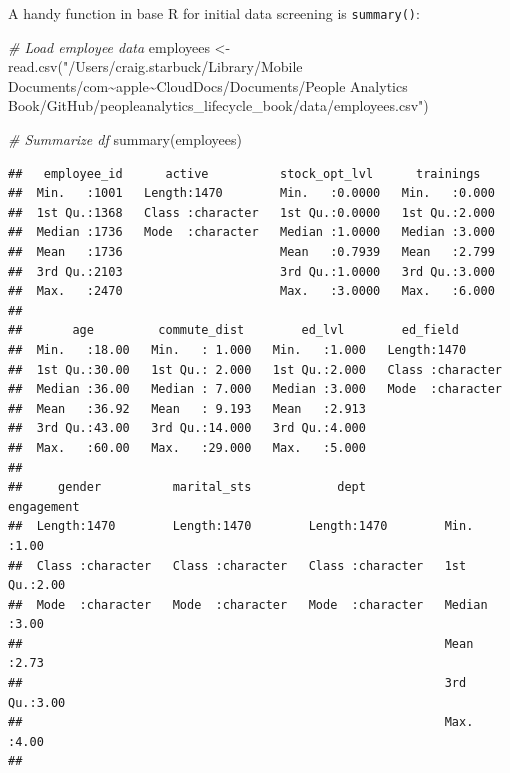 \documentclass[
]{book}
\newenvironment{Shaded}{\begin{snugshade}}{\end{snugshade}}
\newcommand{\CommentTok}[1]{\textcolor[rgb]{0.56,0.35,0.01}{\textit{#1}}}
\newcommand{\FunctionTok}[1]{\textcolor[rgb]{0.00,0.00,0.00}{#1}}
\newcommand{\NormalTok}[1]{#1}
\newcommand{\OtherTok}[1]{\textcolor[rgb]{0.56,0.35,0.01}{#1}}
\newcommand{\StringTok}[1]{\textcolor[rgb]{0.31,0.60,0.02}{#1}}
\begin{document}
A handy function in base R for initial data screening is \texttt{summary()}:

\begin{Shaded}
\begin{Highlighting}[]
\CommentTok{\# Load employee data}
\NormalTok{employees }\OtherTok{\textless{}{-}} \FunctionTok{read.csv}\NormalTok{(}\StringTok{"/Users/craig.starbuck/Library/Mobile Documents/com\textasciitilde{}apple\textasciitilde{}CloudDocs/Documents/People Analytics Book/GitHub/peopleanalytics\_lifecycle\_book/data/employees.csv"}\NormalTok{)}

\CommentTok{\# Summarize df}
\FunctionTok{summary}\NormalTok{(employees)}
\end{Highlighting}
\end{Shaded}

\begin{verbatim}
##   employee_id      active          stock_opt_lvl      trainings    
##  Min.   :1001   Length:1470        Min.   :0.0000   Min.   :0.000  
##  1st Qu.:1368   Class :character   1st Qu.:0.0000   1st Qu.:2.000  
##  Median :1736   Mode  :character   Median :1.0000   Median :3.000  
##  Mean   :1736                      Mean   :0.7939   Mean   :2.799  
##  3rd Qu.:2103                      3rd Qu.:1.0000   3rd Qu.:3.000  
##  Max.   :2470                      Max.   :3.0000   Max.   :6.000  
##                                                                    
##       age         commute_dist        ed_lvl        ed_field        
##  Min.   :18.00   Min.   : 1.000   Min.   :1.000   Length:1470       
##  1st Qu.:30.00   1st Qu.: 2.000   1st Qu.:2.000   Class :character  
##  Median :36.00   Median : 7.000   Median :3.000   Mode  :character  
##  Mean   :36.92   Mean   : 9.193   Mean   :2.913                     
##  3rd Qu.:43.00   3rd Qu.:14.000   3rd Qu.:4.000                     
##  Max.   :60.00   Max.   :29.000   Max.   :5.000                     
##                                                                     
##     gender          marital_sts            dept             engagement  
##  Length:1470        Length:1470        Length:1470        Min.   :1.00  
##  Class :character   Class :character   Class :character   1st Qu.:2.00  
##  Mode  :character   Mode  :character   Mode  :character   Median :3.00  
##                                                           Mean   :2.73  
##                                                           3rd Qu.:3.00  
##                                                           Max.   :4.00  
##                                                                         

\end{verbatim}
\end{document}

